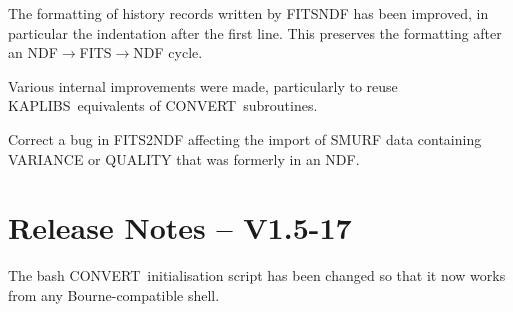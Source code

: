 \documentclass[twoside,11pt]{article}
\newcommand{\htmlref}[2]{#1}
\newcommand{\xref}[3]{#1}
\newcommand{\CONVERT}{{\footnotesize CONVERT}}
\newcommand{\KAPLIBS}{{\footnotesize KAPLIBS}}
\newcommand{\KAPLIBSref}{\xref{\KAPLIBS}{sun238}{}}
\begin{document}
The formatting of history records written by FITSNDF has been
improved, in particular the indentation after the first line. This
preserves the formatting after an NDF$\rightarrow$FITS$\rightarrow$NDF cycle.

Various internal improvements were made, particularly to reuse
\KAPLIBSref\ equivalents of \CONVERT\ subroutines.

Correct a bug in \htmlref{FITS2NDF}{FITS2NDF} affecting the import of
SMURF data containing VARIANCE or QUALITY that was formerly in an NDF.

\section{Release Notes -- V1.5-17}

The bash \CONVERT\ initialisation script has been changed so that it
now works from any Bourne-compatible shell.
\end{document}
